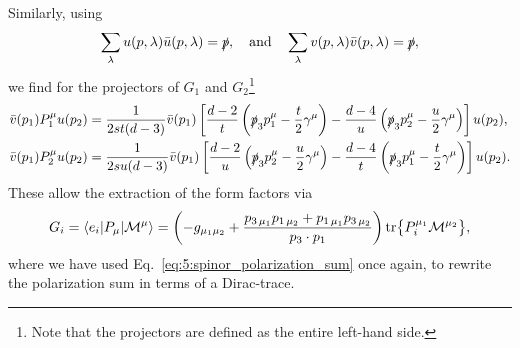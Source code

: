 Similarly, using
\begin{equation}
\sum_{\lambda} u(p, \lambda) \bar{u}(p, \lambda) = \slashed{p}, \quad \text{and} \quad \sum_\lambda v(p, \lambda) \bar{v}(p, \lambda) = \slashed{p},
\label{eq:5:spinor_polarization_sum}
\end{equation}
we find for the projectors of $G_1$ and $G_2$\footnote{Note that the projectors are defined as the entire left-hand side.}
\begin{equation}
\begin{split}
\bar{v}(p_1) P_1^\mu u(p_2) &= \frac{1}{2 s t (d - 3)} \bar{v}(p_1) \left[ \frac{d - 2}{t} \left(\slashed{p}_3 p_1^\mu - \frac{t}{2} \gamma^\mu \right) - \frac{d - 4}{u} \left(\slashed{p}_3 p_2^\mu - \frac{u}{2} \gamma^\mu \right) \right]u(p_2), \\
\bar{v}(p_1) P_2^\mu u(p_2) &= \frac{1}{2 s u (d - 3)} \bar{v}(p_1) \left[ \frac{d - 2}{u} \left(\slashed{p}_3 p_2^\mu - \frac{u}{2} \gamma^\mu \right) - \frac{d - 4}{t} \left(\slashed{p}_3 p_1^\mu - \frac{t}{2} \gamma^\mu \right) \right] u(p_2). \\
\end{split}
\end{equation}
These allow the extraction of the form factors via
\begin{equation}
\begin{split}
G_i = \braket{e_i| P_\mu |\mathcal{M}^\mu} =  \left(-g_{\mu_1 \mu_2} + \frac{p_{3\, \mu_1} p_{1\, \mu_2} + p_{1\, \mu_1} p_{3\, \mu_2}}{p_3 \cdot p_1} \right) \text{tr} \big \lbrace P_i^{\mu_1} \mathcal{M}^{\mu_2} \big \rbrace,
\end{split}
\end{equation}
where we have used Eq.~\eqref{eq:5:spinor_polarization_sum} once again, to rewrite the polarization sum in terms of a Dirac-trace.

